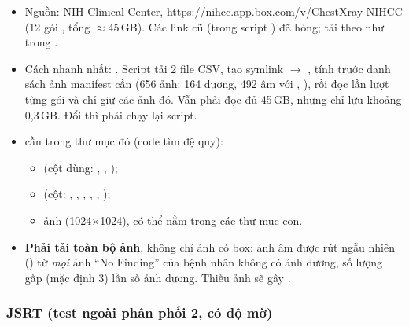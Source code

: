 \begin{itemize}
\item Nguồn: NIH Clinical Center, \url{https://nihcc.app.box.com/v/ChestXray-NIHCC} (12 gói , tổng $\approx$45\,GB). Các link  cũ (trong script ) đã hỏng; tải theo  như trong .
\item Cách nhanh nhất: . Script tải 2 file CSV, tạo symlink  $\rightarrow$ , tính trước danh sách ảnh manifest cần (656 ảnh: 164 dương, 492 âm với , ), rồi đọc lần lượt từng gói và chỉ giữ các ảnh đó. Vẫn phải đọc đủ 45\,GB, nhưng chỉ lưu khoảng 0{,}3\,GB. Đổi  thì phải chạy lại script.
\item {} cần trong thư mục đó (code tìm đệ quy):
  \begin{itemize}
  \item {} (cột dùng: , , );
  \item {} (cột: , , \code{Bbox [x}, , , \code{h]});
  \item ảnh  (1024$\times$1024), có thể nằm trong các thư mục con.
  \end{itemize}
\item \textbf{Phải tải toàn bộ ảnh}, không chỉ ảnh có box: ảnh âm được rút ngẫu nhiên () từ \emph{mọi} ảnh ``No Finding'' của bệnh nhân không có ảnh dương,
      số lượng gấp  (mặc định 3) lần số ảnh dương. Thiếu ảnh sẽ gây .
\end{itemize}

\subsubsection{JSRT (test ngoài phân phối 2, có độ mờ)}

